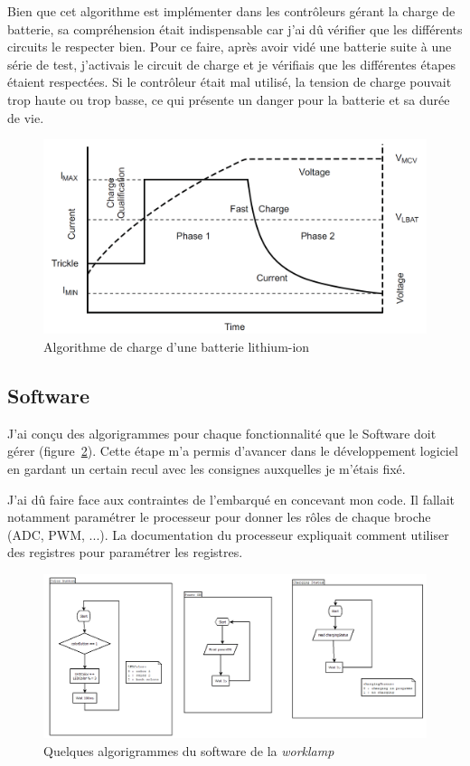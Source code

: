 \documentclass[a4paper, 12pt, sffamily]{report}
\begin{document}
Bien que cet algorithme est implémenter dans les contrôleurs gérant la charge de batterie, sa compréhension était indispensable car j'ai dû vérifier que les différents circuits le respecter bien. Pour ce faire, après avoir vidé une batterie suite à une série de test, j'activais le circuit de charge et je vérifiais que les différentes étapes étaient respectées. Si le contrôleur était mal utilisé, la tension de charge pouvait trop haute ou trop basse, ce qui présente un danger pour la batterie et sa durée de vie.



\begin{figure}[H]
\centering
\includegraphics[scale=0.65]{figures/screenshots/Li-ion_charge_algortihm.png}
\caption{Algorithme de charge d’une batterie lithium-ion \cite{BQ2000_datasheet}} 
\label{fig:li-ion_charge}
\end{figure}

\subsection{Software}
J'ai conçu des algorigrammes pour chaque fonctionnalité que le Software doit gérer (figure~\ref{fig:flow_chart}). Cette étape m'a permis d'avancer dans le développement logiciel en gardant un certain recul avec les consignes auxquelles je m'étais fixé.

J'ai dû faire face aux contraintes de l'embarqué en concevant mon code. Il fallait notamment paramétrer le processeur pour donner les rôles de chaque broche (ADC, PWM, ...). La documentation du processeur expliquait comment utiliser des registres pour paramétrer les registres. 

\begin{figure}[H]
\centering
\includegraphics[scale=0.7]{figures/screenshots/flow_chart.png}
\caption{Quelques algorigrammes du software de la \emph{worklamp}} 
\label{fig:flow_chart}
\end{figure}
\end{document}
